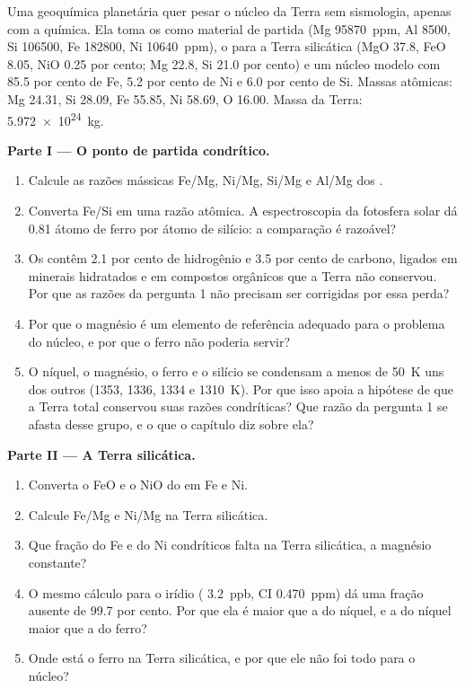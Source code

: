 \begin{problem}
\label{pb:b2:elements-in-the-earth:1}
Uma geoquímica planetária quer pesar o núcleo da Terra sem sismologia, apenas
com a química. Ela toma os  como material de partida
(Mg \qty{95870}{ppm}, Al 8500, Si \num{106500}, Fe \num{182800},
Ni \qty{10640}{ppm}), o  para a Terra silicática (MgO 37.8, FeO
8.05, NiO 0.25 por cento; Mg 22.8, Si 21.0 por cento) e um núcleo modelo com 85.5
por cento de Fe, 5.2 por cento de Ni e 6.0 por cento de Si. Massas atômicas: Mg 24.31,
Si 28.09, Fe 55.85, Ni 58.69, O 16.00. Massa da Terra:
\qty{5.972e24}{kg}.

\medskip\noindent\textbf{Parte I --- O ponto de partida condrítico.}
\begin{enumerate}
\item Calcule as razões mássicas Fe/Mg, Ni/Mg, Si/Mg e Al/Mg dos .
\item Converta Fe/Si em uma razão atômica. A espectroscopia da fotosfera solar
dá 0.81 átomo de ferro por átomo de silício: a comparação é razoável?
\item Os  contêm 2.1 por cento de hidrogênio e 3.5 por cento de carbono, ligados em
minerais hidratados e em compostos orgânicos que a Terra não conservou. Por que
as razões da pergunta 1 não precisam ser corrigidas por essa perda?
\item Por que o magnésio é um elemento de referência adequado para o problema do núcleo, e
por que o ferro não poderia servir?
\item O níquel, o magnésio, o ferro e o silício se condensam a menos de \qty{50}{K} uns dos
outros (1353, 1336, 1334 e \qty{1310}{K}). Por que isso apoia a
hipótese de que a Terra total conservou suas razões condríticas? Que razão da
pergunta 1 se afasta desse grupo, e o que o capítulo diz sobre ela?
\end{enumerate}

\noindent\textbf{Parte II --- A Terra silicática.}
\begin{enumerate}[resume]
\item Converta o FeO e o NiO do  em Fe e Ni.
\item Calcule Fe/Mg e Ni/Mg na Terra silicática.
\item Que fração do Fe e do Ni condríticos falta na Terra
silicática, a magnésio constante?
\item O mesmo cálculo para o irídio ( \qty{3.2}{ppb}, CI
\qty{0.470}{ppm}) dá uma fração ausente de 99.7 por cento. Por que ela é maior
que a do níquel, e a do níquel maior que a do ferro?
\item Onde está o ferro na Terra silicática, e por que ele não foi todo para o
núcleo?
\end{enumerate}


\end{problem}
